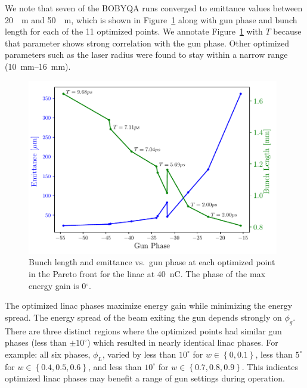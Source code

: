 We note that seven of the BOBYQA runs converged to emittance values
between \SI{20}{\mu m} and \SI{50}{\mu m}, which is shown in Figure~\ref{fig:trade} 
along with gun phase and bunch length for each of the 11
optimized points. We annotate Figure~\ref{fig:trade} with $T$ because that parameter 
shows strong correlation with the gun phase. Other optimized parameters such as the laser radius were found to stay within a 
narrow range (\SIrange{10}{16}{mm}).  
\begin{figure}[h]
	\captionsetup{width=0.98\linewidth}
	\begin{center}
		\includegraphics[width=0.98\textwidth]{images/THPAB155f3}
		\caption{\label{fig:trade}Bunch length and emittance vs.~gun phase at each optimized point in the Pareto front for the linac at \SI{40}{nC}. The phase of the max energy gain is 0$^{\circ}$.}
	\end{center}
\end{figure}


The optimized linac phases maximize energy gain while minimizing the energy spread.
The energy spread of the beam exiting the gun depends strongly on $\phi_g$.
There are three distinct regions where the optimized points had similar gun phases 
(less than $\pm10^{\circ}$) which resulted in nearly identical linac phases. For example:  
all six phases, $\phi_L$, varied by less than $10^{\circ}$ for $w \in \left\{ 0, 0.1\right\}$,
less than $5^{\circ}$ for $w \in \left\{ 0.4, 0.5, 0.6\right\}$, 
and less than $10^{\circ}$ for $w \in \left\{ 0.7, 0.8, 0.9\right\}$.
This indicates optimized linac phases may benefit a range of gun settings during operation. 


